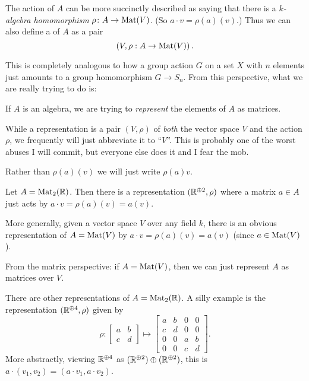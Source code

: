 \begin{definition}
	The action of $A$ can be more succinctly described as saying
	that there is a \emph{$k$-algebra homomorphism} $\rho \colon A \to \mathrm{Mat}(V)$.
	(So $a \cdot v = \rho(a)(v)$.)
	Thus we can also define a  of $A$ as a pair
	\[ \left( V, \rho : A \to \mathrm{Mat}(V) \right). \]
\end{definition}
This is completely analogous to how a group action $G$ on a set $X$
with $n$ elements just amounts to a group homomorphism $G \to S_n$.
From this perspective, what we are really trying to do is:
\begin{moral}
	If $A$ is an algebra,
	we are trying to \emph{represent}
	the elements of $A$ as matrices.
\end{moral}

\begin{abuse}
	While a representation is a pair $(V, \rho)$
	of \emph{both} the vector space $V$ and the action $\rho$,
	we frequently will just abbreviate it to ``$V$''.
	This is probably one of the worst abuses I will commit,
	but everyone else does it and I fear the mob.
\end{abuse}
\begin{abuse}
	Rather than $\rho(a)(v)$ we will just write $\rho(a)v$.
\end{abuse}

\begin{example}
	\listhack
	\begin{enumerate}[(a)]
		\ii Let $A = \mathrm{Mat}_2(\mathbb R)$.
		Then there is a representation $(\mathbb R^{\oplus 2}, \rho)$
		where a matrix $a \in A$ just acts by $a \cdot v = \rho(a)(v) = a(v)$.

		\ii More generally, given a vector space $V$ over any field $k$,
		there is an obvious representation of $A = \mathrm{Mat}(V)$
		by $a \cdot v = \rho(a)(v) = a(v)$ (since $a \in \mathrm{Mat}(V)$).

		From the matrix perspective: if $A = \mathrm{Mat}(V)$,
		then we can just represent $A$ as matrices over $V$.

		\ii There are other representations of $A = \mathrm{Mat}_2(\mathbb R)$.
		A silly example is the representation $(\mathbb R^{\oplus 4}, \rho)$ given by
		\[
			\rho :
			\begin{bmatrix} a & b \\ c & d \end{bmatrix}
			\mapsto
			\begin{bmatrix} a & b & 0 & 0 \\ c & d & 0 & 0 \\
				0 & 0 & a & b \\ 0 & 0 & c & d \end{bmatrix} .
		\]
		More abstractly, viewing $\mathbb R^{\oplus 4}$ as
		$(\mathbb R^{\oplus 2}) \oplus (\mathbb R^{\oplus 2})$,
		this is $a \cdot (v_1,v_2) = (a \cdot v_1, a \cdot v_2)$.
	\end{enumerate}
\end{example}

